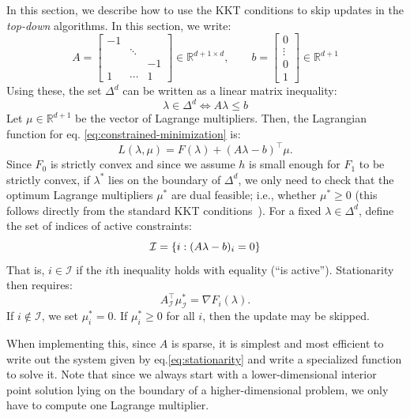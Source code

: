\documentclass[smallcondensed]{svjour3}
\begin{document}
In this section, we describe how to use the KKT conditions to skip
updates in the \emph{top-down} algorithms. In this section, we write:
\begin{equation}
  A = \begin{bmatrix}
    -1 & & \\
    & \ddots & \\
    & & -1 \\
    1 & \cdots & 1
  \end{bmatrix} \in \mathbb{R}^{d + 1 \times d}, \qquad b = \begin{bmatrix}
    0 \\ \vdots \\ 0 \\ 1
  \end{bmatrix} \in \mathbb{R}^{d + 1}
\end{equation}
Using these, the set $\Delta^d$ can be written as a linear matrix
inequality:
\begin{equation}
  \lambda \in \Delta^d \iff A\lambda \leq b
\end{equation}
Let $\mu \in \mathbb{R}^{d + 1}$ be the vector of Lagrange
multipliers. Then, the Lagrangian function for eq.\@
\ref{eq:constrained-minimization} is:
\begin{equation}
  L(\lambda, \mu) = F(\lambda) + (A\lambda - b)^\top \mu.
\end{equation}
Since $F_0$ is strictly convex and since we assume $h$ is small enough
for $F_1$ to be strictly convex, if $\lambda^*$ lies on the boundary
of $\Delta^d$, we only need to check that the optimum Lagrange
multipliers $\mu^*$ are dual feasible; i.e., whether $\mu^* \geq 0$
(this follows directly from the standard KKT
conditions~\cite{bertsekas1999nonlinear,nocedal2006numerical}). For a
fixed $\lambda \in \Delta^d$, define the set of indices of active
constraints:
\begin{equation}
  \mathcal{I} = \left\{i : (A\lambda - b)_i = 0\right\}
\end{equation}
That is, $i \in \mathcal{I}$ if the $i$th inequality holds with
equality (``is active''). Stationarity then requires:
\begin{equation}\label{eq:stationarity}
  A^\top_{\mathcal{I}} \mu_{\mathcal{I}}^* = \nabla F_i(\lambda).
\end{equation}
If $i \notin \mathcal{I}$, we set $\mu_i^* = 0$. If $\mu^*_i \geq 0$
for all $i$, then the update may be skipped.

When implementing this, since $A$ is sparse, it is simplest and most
efficient to write out the system given by eq.\@ \ref{eq:stationarity}
and write a specialized function to solve it. Note that since we
always start with a lower-dimensional interior point solution lying on
the boundary of a higher-dimensional problem, we only have to compute
one Lagrange multiplier.
\end{document}

